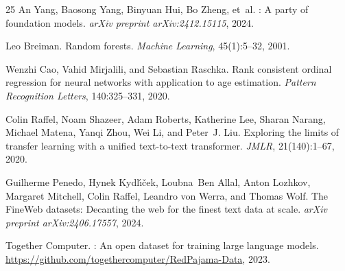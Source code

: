 \documentclass[11pt,a4paper]{article}
\begin{document}
\begin{thebibliography}{25}
An Yang, Baosong Yang, Binyuan Hui, Bo Zheng, et~al.
: A party of foundation models.
\newblock \emph{arXiv preprint arXiv:2412.15115}, 2024.

Leo Breiman.
\newblock Random forests.
\newblock \emph{Machine Learning}, 45(1):5--32, 2001.

Wenzhi Cao, Vahid Mirjalili, and Sebastian Raschka.
\newblock Rank consistent ordinal regression for neural networks with application to age estimation.
\newblock \emph{Pattern Recognition Letters}, 140:325--331, 2020.

Colin Raffel, Noam Shazeer, Adam Roberts, Katherine Lee, Sharan Narang, Michael Matena, Yanqi Zhou, Wei Li, and Peter~J. Liu.
\newblock Exploring the limits of transfer learning with a unified text-to-text transformer.
\newblock \emph{JMLR}, 21(140):1--67, 2020.

Guilherme Penedo, Hynek Kydl{\'\i}\v{c}ek, Loubna~Ben Allal, Anton Lozhkov, Margaret Mitchell, Colin Raffel, Leandro von Werra, and Thomas Wolf.
\newblock The {FineWeb} datasets: Decanting the web for the finest text data at scale.
\newblock \emph{arXiv preprint arXiv:2406.17557}, 2024.

Together Computer.
: An open dataset for training large language models.
\newblock \url{https://github.com/togethercomputer/RedPajama-Data}, 2023.

\end{thebibliography}
\end{document}
